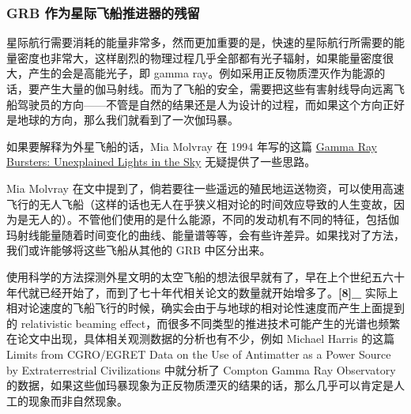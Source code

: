 \documentclass[letterpaper,10pt,english]{sphinxmanual}
\begin{document}
\subsubsection{GRB 作为星际飞船推进器的残留}
\label{physics:id23}
星际航行需要消耗的能量非常多，然而更加重要的是，快速的星际航行所需要的能量密度也非常大，这样剧烈的物理过程几乎全部都有光子辐射，如果能量密度很大，产生的会是高能光子，即 gamma ray。例如采用正反物质湮灭作为能源的话，要产生大量的伽马射线。而为了飞船的安全，需要把这些有害射线导向远离飞船驾驶员的方向——不管是自然的结果还是人为设计的过程，而如果这个方向正好是地球的方向，那么我们就看到了一次伽玛暴。

如果要解释为外星飞船的话，Mia Molvray 在 1994 年写的这篇 \href{http://www.molvray.com/sf/grb/grblog2.htm}{Gamma Ray Bursters: Unexplained Lights in the Sky} 无疑提供了一些思路。

Mia Molvray 在文中提到了，倘若要往一些遥远的殖民地运送物资，可以使用高速飞行的无人飞船（这样的话也无人在乎狭义相对论的时间效应导致的人生变故，因为是无人的）。不管他们使用的是什么能源，不同的发动机有不同的特征，包括伽玛射线能量随着时间变化的曲线、能量谱等等，会有些许差异。如果找对了方法，我们或许能够将这些飞船从其他的 GRB 中区分出来。

使用科学的方法探测外星文明的太空飞船的想法很早就有了，早在上个世纪五六十年代就已经开始了，而到了七十年代相关论文的数量就开始增多了。{\color{red}\bfseries{}{[}8{]}\_} 实际上相对论速度的飞船飞行的时候，确实会由于与地球的相对论性速度而产生上面提到的 relativistic beaming effect，而很多不同类型的推进技术可能产生的光谱也频繁在论文中出现，具体相关观测数据的分析也有不少，例如 Michael Harris 的这篇 Limits from CGRO/EGRET Data on the Use of Antimatter as a Power Source by Extraterrestrial Civilizations 中就分析了 Compton Gamma Ray Observatory 的数据，如果这些伽玛暴现象为正反物质湮灭的结果的话，那么几乎可以肯定是人工的现象而非自然现象。
\end{document}
